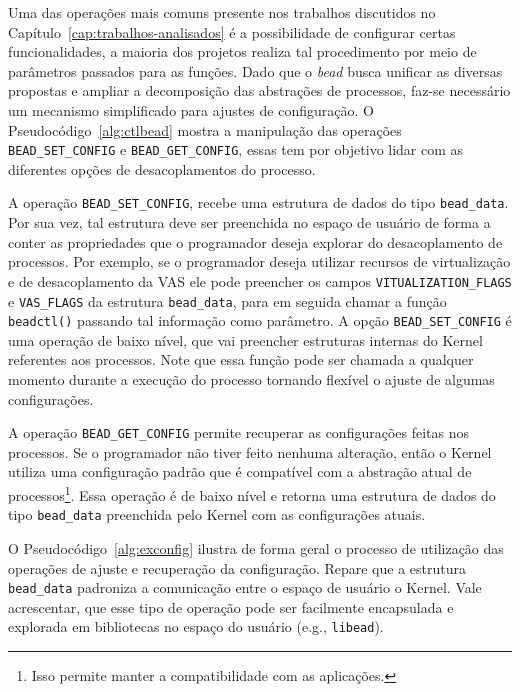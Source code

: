 Uma das operações mais comuns presente nos trabalhos discutidos no
Capítulo~\ref{cap:trabalhos-analisados} é a possibilidade de configurar certas
funcionalidades, a maioria dos projetos realiza tal procedimento por meio de
parâmetros passados para as funções. Dado que o \emph{bead} busca unificar as
diversas propostas e ampliar a decomposição das abstrações de processos,
faz-se necessário um mecanismo simplificado para ajustes de configuração. O
Pseudocódigo~\ref{alg:ctlbead} mostra a manipulação das operações
\texttt{BEAD\_SET\_CONFIG} e \texttt{BEAD\_GET\_CONFIG}, essas tem por objetivo
lidar com as diferentes opções de desacoplamentos do processo.

A operação \texttt{BEAD\_SET\_CONFIG}, recebe uma estrutura de dados do tipo
\texttt{bead\_data}. Por sua vez, tal estrutura deve ser preenchida no espaço
de usuário de forma a conter as propriedades que o programador deseja explorar
do desacoplamento de processos. Por exemplo, se o programador deseja utilizar
recursos de virtualização e de desacoplamento da VAS ele pode preencher os
campos \texttt{VITUALIZATION\_FLAGS} e \texttt{VAS\_FLAGS} da estrutura
\texttt{bead\_data}, para em seguida chamar a função \texttt{beadctl()}
passando tal informação como parâmetro. A opção \texttt{BEAD\_SET\_CONFIG} é
uma operação de baixo nível, que vai preencher estruturas internas do Kernel
referentes aos processos. Note que essa função pode ser chamada a qualquer
momento durante a execução do processo tornando flexível o ajuste de algumas
configurações.

A operação \texttt{BEAD\_GET\_CONFIG} permite recuperar as configurações feitas
nos processos. Se o programador não tiver feito nenhuma alteração, então o
Kernel utiliza uma configuração padrão que é compatível com a abstração atual
de processos\footnote{Isso permite manter a compatibilidade com as
aplicações.}. Essa operação é de baixo nível e retorna uma estrutura de dados
do tipo \texttt{bead\_data} preenchida pelo Kernel com as configurações atuais.



O Pseudocódigo~\ref{alg:exconfig} ilustra de forma geral o processo de
utilização das operações de ajuste e recuperação da configuração. Repare que a
estrutura \texttt{bead\_data} padroniza a comunicação entre o espaço de usuário
o Kernel. Vale acrescentar, que esse tipo de operação pode ser facilmente
encapsulada e explorada em bibliotecas no espaço do usuário (e.g.,
\texttt{libead}).

